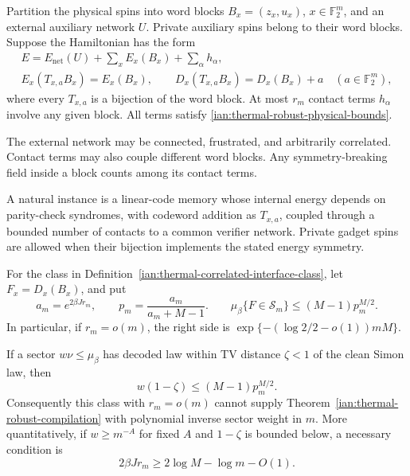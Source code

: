 \begin{definition}
\label{ian:thermal-correlated-interface-class}
Partition the physical spins into word blocks
\(B_x=(z_x,u_x)\), \(x\in\mathbb F_2^m\), and an external auxiliary
network \(U\). Private auxiliary spins belong to their word blocks.
Suppose the Hamiltonian has the form
\[
 \begin{gathered}
 E=E_{\mathrm{net}}(U)+\sum_xE_x(B_x)
                       +\sum_\alpha h_\alpha,\\
 E_x(T_{x,a}B_x)=E_x(B_x),\qquad
 D_x(T_{x,a}B_x)=D_x(B_x)+a
       \quad(a\in\mathbb F_2^m),
 \end{gathered}
 \tag{38.19}
\]
where every \(T_{x,a}\) is a bijection of the word block.
At most \(r_m\) contact terms \(h_\alpha\) involve any given block.
All terms satisfy
\eqref{ian:thermal-robust-physical-bounds}.

The external network may be connected, frustrated, and arbitrarily
correlated. Contact terms may also couple different word blocks.
Any symmetry-breaking field inside a block counts among its contact
terms.

A natural instance is a linear-code memory whose internal energy
depends on parity-check syndromes, with codeword addition as
\(T_{x,a}\), coupled through a bounded number of contacts to a common
verifier network. Private gadget spins are allowed when their
bijection implements the stated energy symmetry.
\end{definition}

\begin{theorem}
\label{ian:thermal-correlated-interface-obstruction}
For the class in
Definition~\ref{ian:thermal-correlated-interface-class}, let
\(F_x=D_x(B_x)\), and put
\[
 a_m=e^{2\beta Jr_m},\qquad
 p_m=\frac{a_m}{a_m+M-1}.
 \qquad
 \mu_\beta\{F\in\mathcal S_m\}
       \le(M-1)p_m^{M/2}.
 \tag{38.20}\label{ian:thermal-correlated-interface-mass}
\]
In particular, if \(r_m=o(m)\), the right side is
\(\exp\{-(\log2/2-o(1))mM\}\).

If a sector \(w\nu\le\mu_\beta\) has decoded law within TV distance
\(\zeta<1\) of the clean Simon law, then
\[
 w(1-\zeta)\le(M-1)p_m^{M/2}.
 \tag{38.21}\label{ian:thermal-correlated-interface-sector}
\]
Consequently this class with \(r_m=o(m)\) cannot supply
Theorem~\ref{ian:thermal-robust-compilation} with polynomial
inverse sector weight in \(m\).
More quantitatively, if \(w\ge m^{-A}\) for fixed \(A\) and
\(1-\zeta\) is bounded below, a necessary condition is
\[
 2\beta Jr_m\ge2\log M-\log m-O(1).
 \tag{38.22}\label{ian:thermal-correlated-interface-necessary}
\]
\end{theorem}

